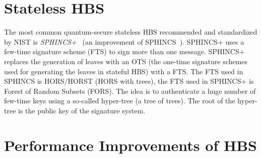 \section{Stateless HBS}
The most common quantum-secure stateless HBS recommended and standardized by NIST is \textit{SPHINCS+}~\cite{tweakable_basispaper_sphincs_2019} (an improvement of SPHINCS~\cite{sphincs_old_version_2015}).
SPHINCS+ uses a few-time signature scheme (FTS) to sign more than one message.
SPHINCS+ replaces the generation of leaves with an OTS (the one-time signature schemes used for generating the leaves in stateful HBS) with a FTS.
The FTS used in SPHINCS is HORS/HORST (HORS with trees), the FTS used in SPHINCS+ is Forest of Random Subsets (FORS). The idea is to authenticate a huge number of few-time keys using a so-called hyper-tree (a tree of trees). The root of the hyper-tree is the public key of the signature system.
~\cite{tweakable_basispaper_sphincs_2019,sphincs+_submission_nist_round2}


\section{Performance Improvements of HBS}










